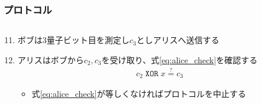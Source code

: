\begin{frame}
  \frametitle{プロトコル}

  \begin{columns}
    \begin{column}{0.5\textwidth}
      \pause
    \end{column}
    \begin{column}{0.5\textwidth}
      \pause
    \end{column}
  \end{columns}

  \pause
  \begin{enumerate}
    \setcounter{enumi}{10}

    \item<+-> ボブは3量子ビット目を測定し$c_3$としアリスへ送信する
    \begin{figure}
    \end{figure}

    \item<+-> アリスはボブから$c_2, c_3$を受け取り、式\ref{eq:alice_check}を確認する
    \begin{align}
      c_2\; \mathtt{XOR}\; x \stackrel{?}{=} c_3 \label{eq:alice_check}
    \end{align}
    \begin{itemize}
      \item 式\ref{eq:alice_check}が等しくなければプロトコルを中止する
    \end{itemize}
  \end{enumerate}
\end{frame}

